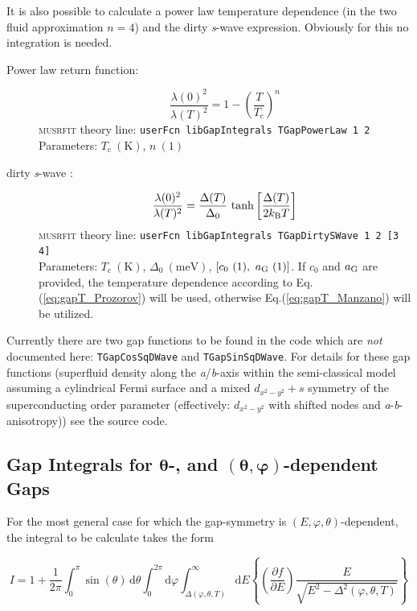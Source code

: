 \documentclass[twoside]{article}
\newcommand{\musrfit}{\textsc{musrfit}\xspace}
\begin{document}
\noindent It is also possible to calculate a power law temperature dependence (in the two fluid approximation $n=4$) and the dirty \textit{s}-wave expression. 
Obviously for this no integration is needed.
\begin{description}
 \item[Power law return function:] 
   \begin{equation}
     \frac{\lambda(0)^2}{\lambda(T)^2} = 1-\left(\frac{T}{T_{\mathrm c}}\right)^n
   \end{equation}
   \musrfit theory line: \verb?userFcn libGapIntegrals TGapPowerLaw 1 2?\\[1.5ex]
   Parameters: $T_{\mathrm c}~(\mathrm{K})$, $n~(1)$
 \item[dirty \textit{s}-wave \cite{Tinkham}:]
    \begin{equation}
      \frac{\lambda(0)^2}{\lambda(T)^2} = \frac{\Delta(T)}{\Delta_0}\,\tanh\left[\frac{\Delta(T)}{2 k_{\rm B} T}\right]
    \end{equation}
    \musrfit theory line: \verb?userFcn libGapIntegrals TGapDirtySWave 1 2 [3 4]?\\[1.5ex]
    Parameters: $T_{\mathrm c}~(\mathrm{K})$, $\Delta_0~(\mathrm{meV})$, $[c_0~(1),~a_{\rm G}~(1)]$. 
    If $c_0$ and $a_{\rm G}$ are provided, the temperature dependence according to Eq.(\ref{eq:gapT_Prozorov}) will be used, 
    otherwise Eq.(\ref{eq:gapT_Manzano}) will be utilized.
\end{description}

\noindent Currently there are two gap functions to be found in the code which are \emph{not} documented here: 
\verb?TGapCosSqDWave? and \verb?TGapSinSqDWave?. For details for these gap functions (superfluid density along the \textit{a}/\textit{b}-axis
within the semi-classical model assuming a cylindrical Fermi surface and a mixed $d_{x^2-y^2} + s$ symmetry of the superconducting order parameter 
(effectively: $d_{x^2-y^2}$ with shifted nodes and \textit{a}-\textit{b}-anisotropy)) see the source code.

\subsection*{Gap Integrals for $\bm{\theta}$-, and $\bm{(\theta, \varphi)}$-dependent Gaps}%

\noindent For the most general case for which the gap-symmetry is $(E,\varphi,\theta)$-dependent, the integral to be calculate takes the form

\begin{equation}\label{eq:int_phi_theta}
  I = 1 + \frac{1}{2\pi} \int_0^\pi \sin(\theta)\, \mathrm{d}\theta \int_0^{2\pi} \mathrm{d}\varphi \int_{\Delta(\varphi,\theta,T)}^\infty \mathrm{d}E \left\{ \left(\frac{\partial f}{\partial E}\right) \frac{E}{\sqrt{E^2 - \Delta^2(\varphi, \theta, T)}} \right\}
\end{equation}
\end{document}
